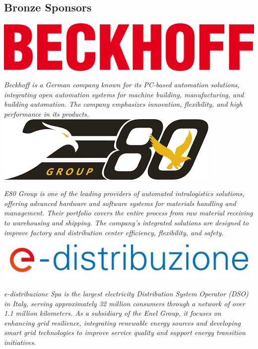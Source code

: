 \documentclass[
	openany, %
	parskip=full, %
	12pt, %
	a4paper, %
]{conferencebooklet} %
\begin{document}
\begin{multicols*}{2}
    \subsection{Bronze Sponsors}    

    \hfill\includegraphics[width=\sponsorscaling\linewidth]{logos/beckhoff.png}\hspace*{\fill}
    
    \textit{Beckhoff is a German company known for its PC-based automation solutions, integrating open automation systems for machine building, manufacturing, and building automation. The company emphasizes innovation, flexibility, and high performance in its products.} \\

    \hfill\includegraphics[width=\sponsorscaling\linewidth]{logos/e80.png}\hspace*{\fill}

    \textit{E80 Group is one of the leading providers of automated intralogistics solutions, offering advanced hardware and software systems for materials handling and management. Their portfolio covers the entire process from raw material receiving to warehousing and shipping. The company's integrated solutions are designed to improve factory and distribution center efficiency, flexibility, and safety.} \\

    \hfill\includegraphics[width=\sponsorscaling\linewidth]{logos/edistribuzione.png}\hspace*{\fill}

    \textit{e-distribuzione Spa is the largest electricity Distribution System Operator (DSO) in Italy, serving approximately 32 million consumers through a network of over 1.1 million kilometers. As a subsidiary of the Enel Group, it focuses on enhancing grid resilience, integrating renewable energy sources and developing smart grid technologies to improve service quality and support energy transition initiatives.}


\end{multicols*}
\end{document}
